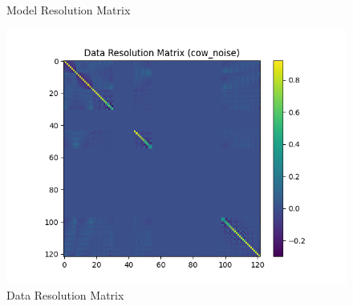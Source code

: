 \documentclass{article}
\begin{document}
\begin{itemize}
\begin{figure}[h]
        \caption{Model Resolution Matrix}
    \end{figure}
    \begin{figure}[h]
        \centering
        \includegraphics[width=1\textwidth]{images/outputs/datares/cow_noise.png}
        \caption{Data Resolution Matrix}
    \end{figure}
    \clearpage



\end{itemize}
\end{document}
